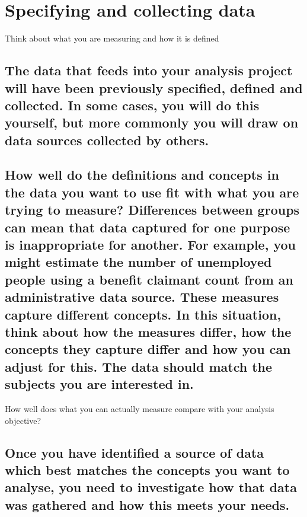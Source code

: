 \documentclass[]{book}
\begin{document}
\section{Specifying and collecting
data}\label{specifying-and-collecting-data}

 Think about what you are measuring and how it is defined

\subsection{The data that feeds into your analysis project will have
been previously specified, defined and collected. In some cases, you
will do this yourself, but more commonly you will draw on data sources
collected by
others.}\label{the-data-that-feeds-into-your-analysis-project-will-have-been-previously-specified-defined-and-collected.-in-some-cases-you-will-do-this-yourself-but-more-commonly-you-will-draw-on-data-sources-collected-by-others.}

\subsection{How well do the definitions and concepts in the data you
want to use fit with what you are trying to measure? Differences between
groups can mean that data captured for one purpose is inappropriate for
another. For example, you might estimate the number of unemployed people
using a benefit claimant count from an administrative data source. These
measures capture different concepts. In this situation, think about how
the measures differ, how the concepts they capture differ and how you
can adjust for this. The data should match the subjects you are
interested
in.}\label{how-well-do-the-definitions-and-concepts-in-the-data-you-want-to-use-fit-with-what-you-are-trying-to-measure-differences-between-groups-can-mean-that-data-captured-for-one-purpose-is-inappropriate-for-another.-for-example-you-might-estimate-the-number-of-unemployed-people-using-a-benefit-claimant-count-from-an-administrative-data-source.-these-measures-capture-different-concepts.-in-this-situation-think-about-how-the-measures-differ-how-the-concepts-they-capture-differ-and-how-you-can-adjust-for-this.-the-data-should-match-the-subjects-you-are-interested-in.}

 How well does what you can actually measure compare with your analysis
objective?

\subsection{Once you have identified a source of data which best matches
the concepts you want to analyse, you need to investigate how that data
was gathered and how this meets your
needs.}\label{once-you-have-identified-a-source-of-data-which-best-matches-the-concepts-you-want-to-analyse-you-need-to-investigate-how-that-data-was-gathered-and-how-this-meets-your-needs.}
\end{document}

